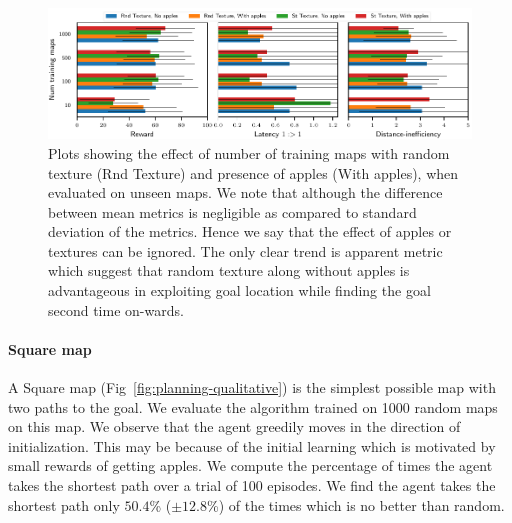 \begin{figure}%
  \includegraphics[width=\linewidth]{images/plot_ntrain_summary.pdf}%
  \caption{Plots showing the effect of number of training maps with random texture (Rnd Texture) and presence of apples (With apples), when evaluated on unseen maps. We note that although the difference between mean metrics is negligible as compared to standard deviation of the metrics. Hence we say that the effect of apples or textures can be ignored.
  The only clear trend is apparent \LatencyOneGtOne{} metric which suggest that random texture along without apples is advantageous in exploiting goal location while finding the goal second time on-wards.}
  \label{fig:num-training-maps}
\end{figure}

\paragraph{Square map}
A Square map (Fig~\ref{fig:planning-qualitative}) is the simplest possible map with two paths to the goal.
We evaluate the algorithm trained on 1000 random maps on this map.
We observe that the agent greedily moves in the direction of
initialization.
This may be because of the initial learning which is
motivated by small rewards of getting apples.
We compute the percentage of times the agent takes the shortest path over a trial of 100 episodes.
We find the agent takes the shortest path only $50.4$\% ($\pm 12.8$\%) of the times which is no better than random.

